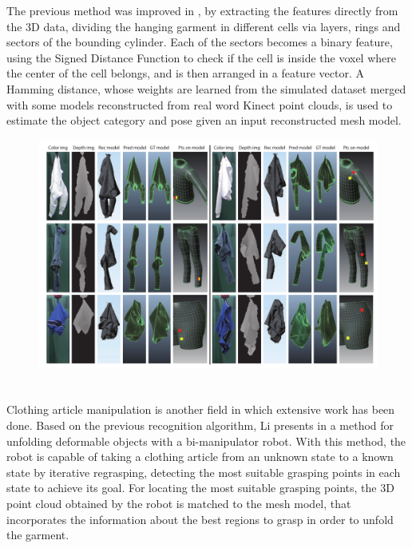 The previous method was improved in \cite{Li2014IROS}, by extracting the features directly from the 3D data, dividing the hanging garment in different cells via layers, rings and sectors of the bounding cylinder. Each of the sectors becomes a binary feature, using the Signed Distance Function to check if the cell is inside the voxel where the center of the cell belongs, and is then arranged in a feature vector. A Hamming distance, whose weights are learned from the simulated dataset merged with some models reconstructed from real word Kinect point clouds, is used to estimate the object category and pose given an input reconstructed mesh model.

\begin{figure}[thpb]
    \centering
    \includegraphics[width=0.9
    \textwidth]{figures/SOTA_Li_2014-2.png}
    \caption{}
    \label{fig:SOTA_Li_2014}
\end{figure}

\section{}
Clothing article manipulation is another field in which extensive work has been done. Based on the previous recognition algorithm, Li presents in \cite{Li2015ICRA} a method for unfolding deformable objects with a bi-manipulator robot. With this method, the robot is capable of taking a clothing article from an unknown state to a known state by iterative regrasping, detecting the most suitable grasping points in each state to achieve its goal. For locating the most suitable grasping points, the 3D point cloud obtained by the robot is matched to the mesh model, that incorporates the information about the best regions to grasp in order to unfold the garment.

